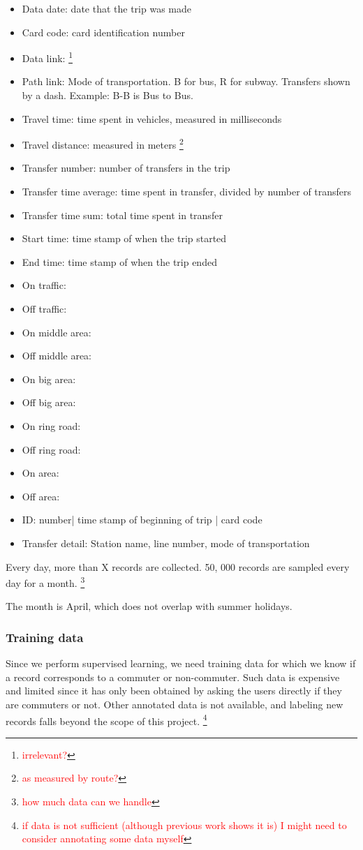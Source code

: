 \documentclass{article}
\newcommand{\selfnote}[1]{\footnote{\textcolor{red}{#1}}}
\begin{document}
\begin{itemize}
\item Data date: date that the trip was made
\item Card code: card identification number
\item Data link: \selfnote{irrelevant?}
\item Path link: Mode of transportation. B for bus, R for subway. Transfers shown by a dash. Example: B-B is Bus to Bus.
\item Travel time: time spent in vehicles, measured in milliseconds
\item Travel distance: measured in meters \footnote{\textcolor{red}{as measured by route?}}
\item Transfer number: number of transfers in the trip
\item Transfer time average: time spent in transfer, divided by number of transfers
\item Transfer time sum: total time spent in transfer
\item Start time: time stamp of when the trip started
\item End time: time stamp of when the trip ended
\item On traffic: 
\item Off traffic:
\item On middle area:
\item Off middle area:
\item On big area:
\item Off big area:
\item On ring road:
\item Off ring road:
\item On area:
\item Off area:
\item ID: number| time stamp of beginning of trip | card code
\item Transfer detail: Station name, line number, mode of transportation
\end{itemize}

Every day, more than X records are collected. 50, 000 records are sampled every day for a month. 
\selfnote{how much data can we handle}

The month is April, which does not overlap with summer holidays. 

\subsubsection{Training data}
Since we perform supervised learning, we need training data for which we know if a record corresponds to a commuter or non-commuter. Such data is expensive and limited since it has only been obtained by asking the users directly if they are commuters or not. Other annotated data is not available, and labeling new records falls beyond the scope of this project. \selfnote{if data is not sufficient (although previous work shows it is) I might need to consider annotating some data myself}
\end{document}
